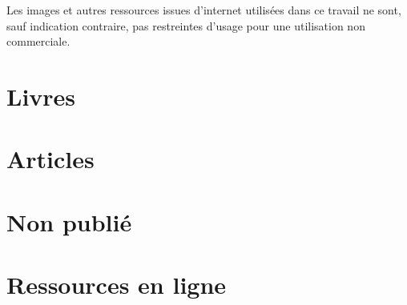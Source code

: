 \documentclass[12pt,fleqn,oneside,openany]{book} %
\begin{document}
\begin{remark}
	Les images et autres ressources issues d'internet utilisées dans ce travail ne sont, sauf indication contraire, pas restreintes d'usage pour une utilisation non commerciale.
\end{remark}

\section*{Livres}
\printbibliography[heading=bibempty,type=book]
\section*{Articles}
\printbibliography[heading=bibempty,type=article]
\section*{Non publié}
\printbibliography[heading=bibempty,type=unpublished]
\section*{Ressources en ligne}
\printbibliography[heading=bibempty,type=online]



\end{document}
